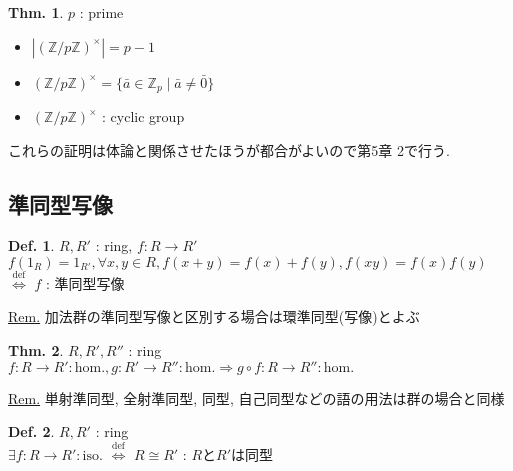 \documentclass[uplatex,dvipdfmx,9pt]{beamer}
\newcommand{\defarrow}{\overset{\mathrm{def}}{\Leftrightarrow}}
\renewcommand{\hom}{\text{hom.}} %
\newcommand{\iso}{\text{iso.}} %
\newcommand{\Z}{\mathbb{Z}}
\newcommand{\sscount}{\textsection \thesubsection}
\newcounter{textExmCount}
\theoremstyle{definition} %
\newtheorem{defn}{Def.}[subsection] %
\newtheorem{thm}{Thm.}[subsection] %
\theoremstyle{example}
\begin{document}
\begin{frame}

  \begin{thm}
    $p$ : prime
    \begin{itemize}
      \item $|(\Z / p\Z)^\times| = p - 1$
      \item $(\Z / p\Z)^\times = \{\bar{a} \in \Z_p \mid \bar{a} \neq \bar{0}\}$
      \item $(\Z / p\Z)^\times$ : cyclic group
    \end{itemize}
  \end{thm}
  これらの証明は体論と関係させたほうが都合がよいので第5章 \textsection 2で行う.

\end{frame}

\subsection{\sscount 準同型写像}
\setcounter{textExmCount}{0}

\begin{frame}

  \begin{defn}
    $R, R'$ : ring, $f\colon R \to R'$ \\
    $f(1_R) = 1_{R'}, \forall x, y \in R, f(x + y) = f(x) + f(y), f(xy) = f(x)f(y)$ $\defarrow$ $f$ : \alert{準同型写像}
  \end{defn}
  \underline{Rem.} 加法群の準同型写像と区別する場合は\alert{環準同型(写像)}とよぶ

  \begin{thm}
    $R, R', R''$ : ring \\
    $f\colon R \to R' : \hom, g\colon R' \to R'' : \hom \Rightarrow g \circ f \colon R \to R'' : \hom$
  \end{thm}
  \underline{Rem.} \alert{単射準同型}, \alert{全射準同型}, \alert{同型}, \alert{自己同型}などの語の用法は群の場合と同様

  \begin{defn}
    $R, R'$ : ring \\
    $\exists f\colon R \to R' : \iso$ $\defarrow$ $R \cong R'$ : $R$と$R'$は\alert{同型}
  \end{defn}

\end{frame}
\end{document}
